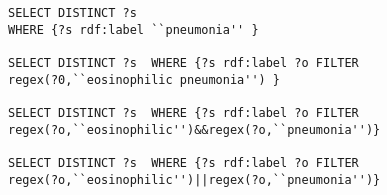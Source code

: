 \begin{footnotesize} 
\begin{verbatim}
SELECT DISTINCT ?s  
WHERE {?s rdf:label ``pneumonia'' } 
 
SELECT DISTINCT ?s  WHERE {?s rdf:label ?o FILTER
regex(?0,``eosinophilic pneumonia'') } 

SELECT DISTINCT ?s  WHERE {?s rdf:label ?o FILTER 
regex(?o,``eosinophilic'')&&regex(?o,``pneumonia'')} 

SELECT DISTINCT ?s  WHERE {?s rdf:label ?o FILTER
regex(?o,``eosinophilic'')||regex(?o,``pneumonia'')} 
\end{verbatim}
\end{footnotesize}

